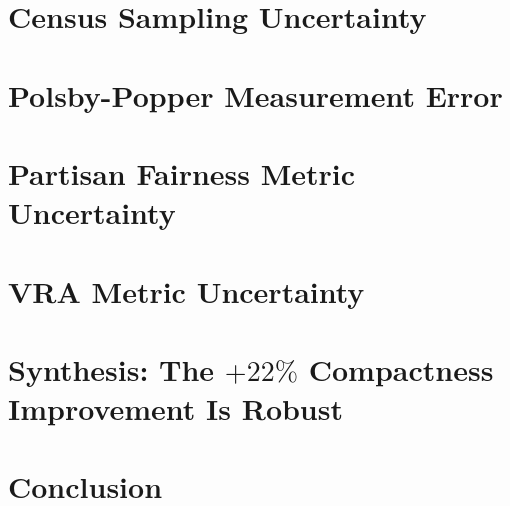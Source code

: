 \documentclass[12pt]{article}
\begin{document}
\section{Census Sampling Uncertainty}
\label{sec:census}


\section{Polsby-Popper Measurement Error}
\label{sec:pp}


\section{Partisan Fairness Metric Uncertainty}
\label{sec:partisan}


\section{VRA Metric Uncertainty}
\label{sec:vra}


\section{Synthesis: The $+22\%$ Compactness Improvement Is Robust}
\label{sec:synthesis}


\section{Conclusion}
\label{sec:conclusion}




\end{document}
